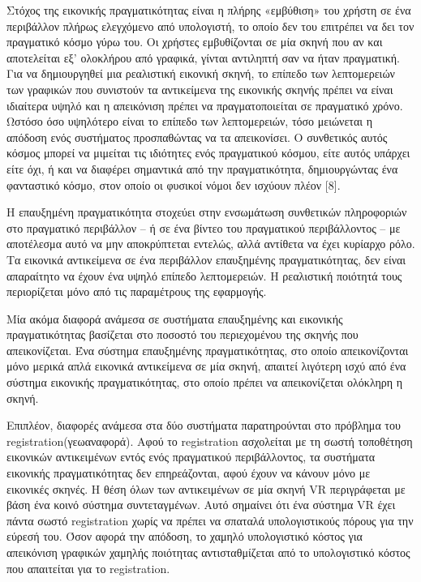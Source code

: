 Στόχος της εικονικής πραγματικότητας είναι η πλήρης «εμβύθιση» του χρήστη σε ένα περιβάλλον πλήρως ελεγχόμενο από υπολογιστή, το οποίο δεν του επιτρέπει να δει τον πραγματικό κόσμο γύρω του. Οι χρήστες εμβυθίζονται σε μία σκηνή που αν και αποτελείται εξ' ολοκλήρου από γραφικά, γίνται αντιληπτή σαν να ήταν πραγματική.  Για να δημιουργηθεί μια ρεαλιστική εικονική σκηνή, το επίπεδο των λεπτομερειών των γραφικών που συνιστούν τα αντικείμενα της εικονικής σκηνής πρέπει να είναι ιδιαίτερα υψηλό και η απεικόνιση πρέπει να πραγματοποιείται σε πραγματικό χρόνο. Ωστόσο όσο υψηλότερο είναι το επίπεδο των λεπτομερειών, τόσο μειώνεται η απόδοση ενός συστήματος προσπαθώντας να τα απεικονίσει. Ο συνθετικός αυτός κόσμος μπορεί να μιμείται τις ιδιότητες ενός πραγματικού κόσμου, είτε αυτός υπάρχει είτε όχι, ή και να διαφέρει σημαντικά από την πραγματικότητα, δημιουργώντας ένα φανταστικό κόσμο, στον οποίο οι φυσικοί νόμοι δεν ισχύουν πλέον [8]. 


Η επαυξημένη πραγματικότητα στοχεύει στην ενσωμάτωση συνθετικών πληροφοριών στο πραγματικό περιβάλλον – ή σε ένα βίντεο του πραγματικού περιβάλλοντος – με αποτέλεσμα αυτό να μην αποκρύπτεται εντελώς, αλλά αντίθετα να έχει κυρίαρχο ρόλο. Τα εικονικά αντικείμενα σε ένα περιβάλλον επαυξημένης πραγματικότητας, δεν είναι απαραίτητο να έχουν ένα υψηλό επίπεδο λεπτομερειών. Η ρεαλιστική ποιότητά τους περιορίζεται μόνο από τις παραμέτρους της εφαρμογής. 

Μία ακόμα διαφορά ανάμεσα σε συστήματα επαυξημένης και εικονικής πραγματικότητας βασίζεται στο ποσοστό του περιεχομένου της σκηνής που απεικονίζεται. Ένα σύστημα επαυξημένης πραγματικότητας, στο οποίο απεικονίζονται μόνο μερικά απλά εικονικά αντικείμενα σε μία σκηνή, απαιτεί λιγότερη ισχύ από ένα σύστημα εικονικής πραγματικότητας, στο οποίο πρέπει να απεικονίζεται ολόκληρη η σκηνή.


Επιπλέον, διαφορές ανάμεσα στα δύο συστήματα παρατηρούνται στο πρόβλημα του registration(γεωαναφορά). Αφού το registration ασχολείται με τη σωστή τοποθέτηση εικονικών αντικειμένων εντός ενός πραγματικού περιβάλλοντος, τα συστήματα εικονικής πραγματικότητας δεν επηρεάζονται, αφού έχουν να κάνουν μόνο με εικονικές σκηνές. Η θέση όλων των αντικειμένων σε μία σκηνή VR περιγράφεται με βάση ένα κοινό σύστημα συντεταγμένων. Αυτό σημαίνει ότι ένα σύστημα VR έχει πάντα σωστό registration χωρίς να πρέπει να σπαταλά υπολογιστικούς πόρους για την εύρεσή του. Όσον αφορά την απόδοση, το χαμηλό υπολογιστικό κόστος για απεικόνιση γραφικών χαμηλής ποιότητας αντισταθμίζεται από το υπολογιστικό κόστος που απαιτείται για το registration.

